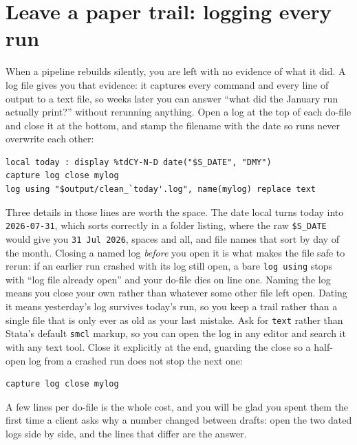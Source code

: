 \documentclass[
    a4paper,
    fontsize=10pt,
    twoside=true,
    numbers=noenddot,
]{kaobook}
\begin{document}
\section{Leave a paper trail: logging every run}\label{sec:logging}
When a pipeline rebuilds silently, you are left with no evidence of what it did. A log file gives you that evidence: it captures every command and every line of output to a text file, so weeks later you can answer \enquote{what did the January run actually print?} without rerunning anything. Open a log at the top of each do-file and close it at the bottom, and stamp the filename with the date so runs never overwrite each other:
\par
{\footnotesize
\begin{verbatim}
local today : display %tdCY-N-D date("$S_DATE", "DMY")
capture log close mylog
log using "$output/clean_`today'.log", name(mylog) replace text
\end{verbatim}
}
Three details in those lines are worth the space. The date local turns today into \texttt{2026-07-31}, which sorts correctly in a folder listing, where the raw \texttt{\$S\_DATE} would give you \texttt{31 Jul 2026}, spaces and all, and file names that sort by day of the month. Closing a named log \emph{before} you open it is what makes the file safe to rerun: if an earlier run crashed with its log still open, a bare \texttt{log using} stops with \enquote{log file already open} and your do-file dies on line one. Naming the log means you close your own rather than whatever some other file left open. Dating it means yesterday's log survives today's run, so you keep a trail rather than a single file that is only ever as old as your last mistake. Ask for \texttt{text} rather than Stata's default \texttt{smcl} markup, so you can open the log in any editor and search it with any text tool. Close it explicitly at the end, guarding the close so a half-open log from a crashed run does not stop the next one:
\par
{\footnotesize
\begin{verbatim}
capture log close mylog
\end{verbatim}
}
A few lines per do-file is the whole cost, and you will be glad you spent them the first time a client asks why a number changed between drafts: open the two dated logs side by side, and the lines that differ are the answer.
\end{document}
